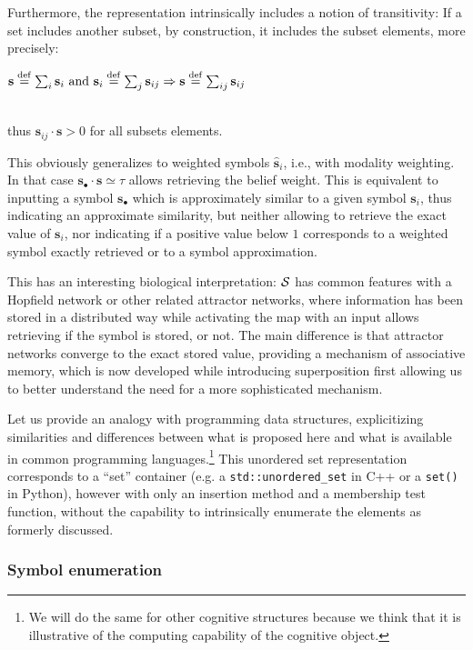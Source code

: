 \documentclass[sn-mathphys]{sn-jnl}
\newcommand{\defq}{\stackrel {\rm def}{=}}
\newcommand{\eqline}[1]{~\vspace{0.1cm}\\\centerline{$#1$}\vspace{0.1cm}\\}
\begin{document}
Furthermore, the representation intrinsically includes a notion of transitivity: If a set includes another subset, by construction, it includes the subset elements, more precisely:
\eqline{\mathbf{s} \defq \sum_i \mathbf{s}_i \mbox{ and } \mathbf{s}_i \defq \sum_j \mathbf{s}_{ij} \Rightarrow \mathbf{s} \defq \sum_{ij} \mathbf{s}_{ij}}
thus $\mathbf{s}_{ij} \cdot \mathbf{s} > 0$ for all subsets elements.

This obviously generalizes to weighted symbols $\hat{\mathbf{s}}_i$, i.e., with modality weighting. In that case $\mathbf{s}_\bullet \cdot \mathbf{s} \simeq \tau$ allows retrieving the belief weight. This is equivalent to inputting a symbol $\mathbf{s}_\bullet$ which is approximately similar to a given symbol $\mathbf{s}_i$, thus indicating an approximate similarity, but neither allowing to retrieve the exact value of $\mathbf{s}_i$, nor indicating if a positive value below $1$ corresponds to a weighted symbol exactly retrieved or to a symbol approximation.

This has an interesting biological interpretation: ${\cal S}$ has common features with a Hopfield network or other related attractor networks, where information has been stored in a distributed way while activating the map with an input allows retrieving if the symbol is stored, or not. The main difference is that attractor networks converge to the exact stored value, providing a mechanism of associative memory, which is now developed while introducing superposition first allowing us to better understand the need for a more sophisticated mechanism.

Let us provide an analogy with programming data structures, explicitizing similarities and differences between what is proposed here and what is available in common programming languages.\footnote{We will do the same for other cognitive structures because we think that it is illustrative of the computing capability of the cognitive object.} This unordered set representation corresponds to a ``set'' container (e.g. a {\tt std::unordered\_set} in C++ or a {\tt set()} in Python), however with only an insertion method and a membership test function, without the capability to intrinsically enumerate the elements as formerly discussed.

\subsubsection{Symbol enumeration}
\end{document}
